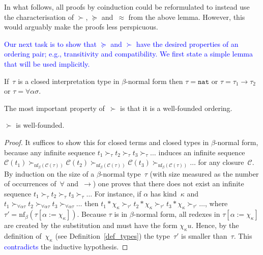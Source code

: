 \documentclass[a4paper,UKenglish,cleveref,autoref,numberwithinsect]{lipics-v2019}
\theoremstyle{definition}
\newcommand{\arrtype}{\rightarrow}
\newcommand{\tapp}[2]{#1 * #2}
\newcommand{\subst}[2]{#1:=#2}
\newcommand{\nat}{\mathtt{nat}}
\newcommand{\cl}{\mathcal{C}}
\newcommand{\nf}{\mathrm{nf}}
\newcommand{\CKchange}[1]{\textcolor{blue}{#1}}
\begin{document}
In what follows, all proofs by coinduction could be reformulated to
instead use the characterisation of $\succ$, $\succeq$ and~$\approx$
from the above lemma. However, this would arguably make the proofs
less perspicuous.

\medskip
\CKchange{Our next task is to show that $\succeq$ and $\succ$ have the
desired properties of an ordering pair; e.g., transitivity and
compatibility.  We first state a simple lemma that will be used
implicitly.}

\begin{lemma}
  If~$\tau$ is a closed interpretation type in $\beta$-normal form
  then $\tau = \nat$ or $\tau = \tau_1\arrtype\tau_2$ or $\tau =
  \forall\alpha\sigma$.
\end{lemma}

The most important property of~$\succ$ is that it is a well-founded
ordering.

\begin{lemma}\label{lem_well_founded}
  $\succ$ is well-founded.
\end{lemma}

\begin{proof}
  It suffices to show this for closed terms and closed types in
  $\beta$-normal form, because any infinite sequence $t_1 \succ_\tau
  t_2 \succ_\tau t_3 \succ_\tau \ldots$ induces an infinite sequence
  $\cl(t_1) \succ_{\nf_\beta(\cl(\tau))} \cl(t_2)
  \succ_{\nf_\beta(\cl(\tau))} \cl(t_3) \succ_{\nf_\beta(\cl(\tau))}
  \ldots$ for any closure~$\cl$. By induction on the size of a
  $\beta$-normal type~$\tau$ (with size measured as the number of
  occurrences of~$\forall$ and~$\arrtype$) one proves that there does
  not exist an infinite sequence $t_1 \succ_\tau t_2 \succ_\tau t_3
  \succ_\tau \ldots$ For instance, if $\alpha$ has kind~$\kappa$ and
  $t_1 \succ_{\forall\alpha\tau} t_2 \succ_{\forall\alpha\tau} t_3
  \succ_{\forall\alpha\tau} \ldots$ then $\tapp{t_1}{\chi_\kappa}
  \succ_{\tau'} \tapp{t_2}{\chi_\kappa} \succ_{\tau'}
  \tapp{t_3}{\chi_\kappa} \succ_{\tau'} \ldots$, where
  $\tau'=\nf_\beta(\tau[\subst{\alpha}{\chi_\kappa}])$. Because $\tau$
  is in $\beta$-normal form, all redexes in
  $\tau[\subst{\alpha}{\chi_\kappa}]$ are created by the substitution
  and must have the form $\chi_\kappa u$. Hence, by the definition
  of~$\chi_\kappa$ (see Definition~\ref{def_types}) the
  type~$\tau'$ is smaller than~$\tau$. This %
  \CKchange{contradicts} %
  the
  inductive hypothesis.
\end{proof}
\end{document}
